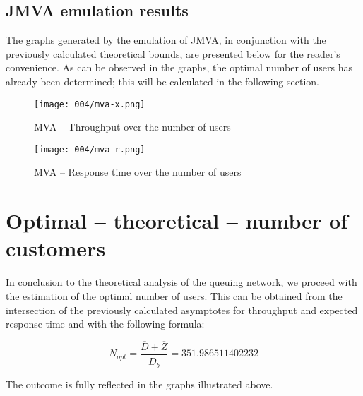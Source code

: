 \subsection{JMVA emulation results}

The graphs generated by the emulation of JMVA, in conjunction with the previously calculated theoretical bounds, are presented below for the reader's convenience.
As can be observed in the graphs, the optimal number of users has already been determined; this will be calculated in the following section.

\begin{figure}[h]
	\centering
	\texttt{[image: 004/mva-x.png]}
	\caption{MVA -- Throughput over the number of users}
\end{figure}

\begin{figure}[h]
	\centering
	\texttt{[image: 004/mva-r.png]}
	\caption{MVA -- Response time over the number of users}
\end{figure}

\clearpage

\section{Optimal -- theoretical -- number of customers}

In conclusion to the theoretical analysis of the queuing network, we proceed with the estimation of the optimal number of users.
This can be obtained from the intersection of the previously calculated asymptotes for throughput and expected response time and with the following formula:

\begin{equation}
	\label{eq:optimal-number-of-users}
	N_{opt} = \frac{\overline{D} + \overline{Z}}{\overline{D}_b} = \num[round-mode=places, round-precision=5]{351.986511402232}
\end{equation}

The outcome is fully reflected in the graphs illustrated above.

